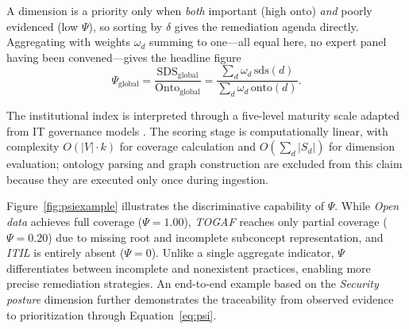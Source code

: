 \documentclass[engproc,proceedingpaper,submit,moreauthors]{Definitions/mdpi}
\begin{document}
    A dimension is a priority only when \emph{both} important (high $\mathrm{onto}$) \emph{and} poorly evidenced (low $\Psi$), so sorting by $\delta$ gives the remediation agenda directly. Aggregating with weights $\omega_d$ summing to one---all equal here, no expert panel having been convened---gives the headline figure
\begin{equation}
\Psi_{\mathrm{global}}=\frac{\mathrm{SDS}_{\mathrm{global}}}{\mathrm{Onto}_{\mathrm{global}}}=\frac{\sum_d \omega_d\,\mathrm{sds}(d)}{\sum_d \omega_d\,\mathrm{onto}(d)}.
\label{eq:global}
\end{equation} 

    The institutional index is interpreted through a five-level maturity scale adapted from IT governance models \cite{DeHaes2013}. The scoring stage is computationally linear, with complexity $O(|V|\cdot k)$ for coverage calculation and $O(\sum_d |S_d|)$ for dimension evaluation; ontology parsing and graph construction are excluded from this claim because they are executed only once during ingestion.
    
    Figure~\ref{fig:psiexample} illustrates the discriminative capability of $\Psi$. While \emph{Open data} achieves full coverage ($\Psi=1.00$), \emph{TOGAF} reaches only partial coverage ($\Psi=0.20$) due to missing root and incomplete subconcept representation, and \emph{ITIL} is entirely absent ($\Psi=0$). Unlike a single aggregate indicator, $\Psi$ differentiates between incomplete and nonexistent practices, enabling more precise remediation strategies. An end-to-end example based on the \emph{Security posture} dimension further demonstrates the traceability from observed evidence to prioritization through Equation~\eqref{eq:psi}.
\end{document}
